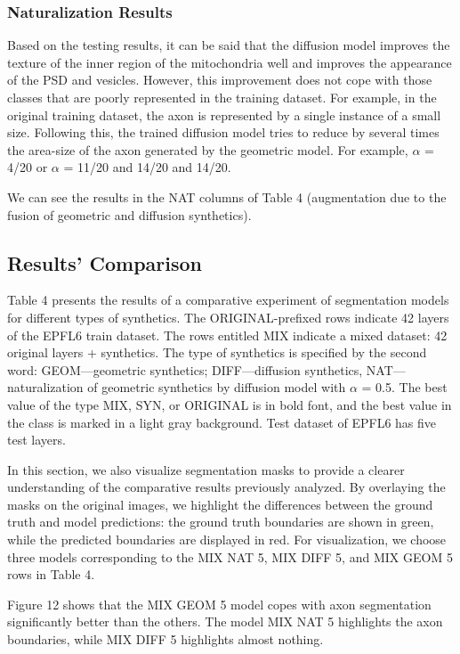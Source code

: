 \documentclass[journal,article,submit,pdftex,moreauthors]{Definitions/mdpi}
\begin{document}
\subsubsection{Naturalization Results}

Based on the testing results, it can be said that the diffusion model improves the texture of the inner region of the mitochondria well and improves the appearance of the PSD and vesicles. However, this improvement does not cope with those classes that are poorly represented in the training dataset. For example, in the original training dataset, the axon is represented by a single instance of a small size. Following this, the trained diffusion model tries to reduce by several times the area-size of the axon generated by the geometric model. For example, $\alpha$ = 4/20 or $\alpha$ = 11/20 and 14/20 and 14/20.

We can see the results in the NAT columns of Table 4 (augmentation due to the fusion of geometric and diffusion synthetics).

\subsection{Results’ Comparison}

Table 4 presents the results of a comparative experiment of segmentation models for different types of synthetics. The ORIGINAL-prefixed rows indicate 42 layers of the EPFL6 train dataset. The rows entitled MIX indicate a mixed dataset: 42 original layers + synthetics. The type of synthetics is specified by the second word: GEOM—geometric synthetics; DIFF—diffusion synthetics, NAT—naturalization of geometric synthetics by diffusion model with $\alpha$ = 0.5. The best value of the type MIX, SYN, or ORIGINAL is in bold font, and the best value in the class is marked in a light gray background. Test dataset of EPFL6 has five test layers.

In this section, we also visualize segmentation masks to provide a clearer understanding of the comparative results previously analyzed. By overlaying the masks on the original images, we highlight the differences between the ground truth and model predictions: the ground truth boundaries are shown in green, while the predicted boundaries are displayed in red. For visualization, we choose three models corresponding to the MIX NAT 5, MIX DIFF 5, and MIX GEOM 5 rows in Table 4.

Figure 12 shows that the MIX GEOM 5 model copes with axon segmentation significantly better than the others. The model MIX NAT 5 highlights the axon boundaries, while MIX DIFF 5 highlights almost nothing.
\end{document}

